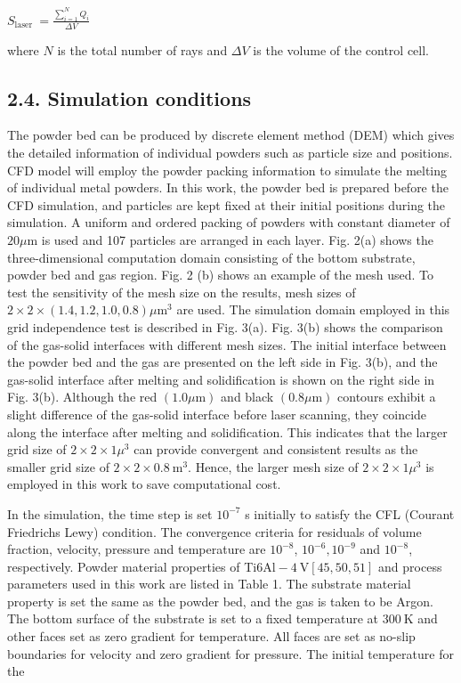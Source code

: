 \documentclass[10pt]{article}
\begin{document}
$S_{\text {laser }}=\frac{\sum_{i=1}^{N} Q_{i}}{\Delta V}$

where $N$ is the total number of rays and $\Delta V$ is the volume of the control cell.

\subsection*{2.4. Simulation conditions}
The powder bed can be produced by discrete element method (DEM) which gives the detailed information of individual powders such as particle size and positions. CFD model will employ the powder packing information to simulate the melting of individual metal powders. In this work, the powder bed is prepared before the CFD simulation, and particles are kept fixed at their initial positions during the simulation. A uniform and ordered packing of powders with constant diameter of $20 \mu \mathrm{m}$ is used and 107 particles are arranged in each layer. Fig. 2(a) shows the three-dimensional computation domain consisting of the bottom substrate, powder bed and gas region. Fig. 2 (b) shows an example of the mesh used. To test the sensitivity of the mesh size on the results, mesh sizes of $2 \times 2 \times(1.4,1.2,1.0,0.8) \mu \mathrm{m}^{3}$ are used. The simulation domain employed in this grid independence test is described in Fig. 3(a). Fig. 3(b) shows the comparison of the gas-solid interfaces with different mesh sizes. The initial interface between the powder bed and the gas are presented on the left side in Fig. 3(b), and the gas-solid interface after melting and solidification is shown on the right side in Fig. 3(b). Although the red $(1.0 \mu \mathrm{m})$ and black $(0.8 \mu \mathrm{m})$ contours exhibit a slight difference of the gas-solid interface before laser scanning, they coincide along the interface after melting and solidification. This indicates that the larger grid size of $2 \times 2 \times 1 \mu^{3}$ can provide convergent and consistent results as the smaller grid size of $2 \times 2 \times 0.8 \mathrm{~m}^{3}$. Hence, the larger mesh size of $2 \times 2 \times 1 \mu^{3}$ is employed in this work to save computational cost.

In the simulation, the time step is set $10^{-7}$ s initially to satisfy the CFL (Courant Friedrichs Lewy) condition. The convergence criteria for residuals of volume fraction, velocity, pressure and temperature are $10^{-8}$, $10^{-6}, 10^{-9}$ and $10^{-8}$, respectively. Powder material properties of Ti$6 \mathrm{Al}-4 \mathrm{~V}[45,50,51]$ and process parameters used in this work are listed in Table 1. The substrate material property is set the same as the powder bed, and the gas is taken to be Argon. The bottom surface of the substrate is set to a fixed temperature at $300 \mathrm{~K}$ and other faces set as zero gradient for temperature. All faces are set as no-slip boundaries for velocity and zero gradient for pressure. The initial temperature for the
\end{document}
